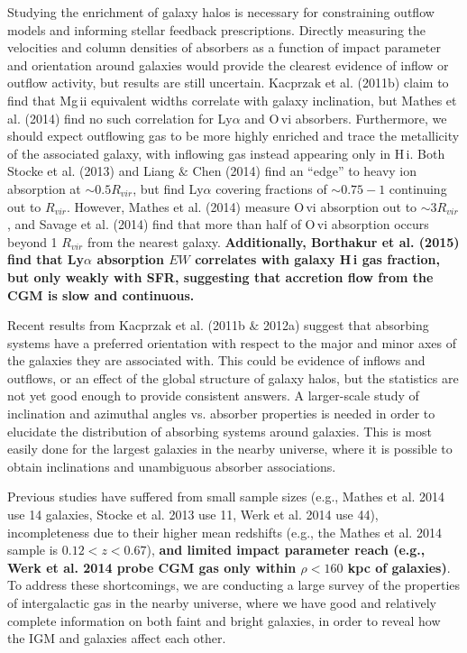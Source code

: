 \documentclass[twocolumn,tighten]{aastex6}
\begin{document}
Studying the enrichment of galaxy halos is necessary for constraining outflow models and informing stellar feedback prescriptions. Directly measuring the velocities and column densities of absorbers as a function of impact parameter and orientation around galaxies would provide the clearest evidence of inflow or outflow activity, but results are still uncertain. Kacprzak et al. (2011b) claim to find that Mg\,{\sc ii} equivalent widths correlate with galaxy inclination, but Mathes et al. (2014) find no such correlation for Ly$\alpha$ and O\,{\sc vi} absorbers. Furthermore, we should expect outflowing gas to be more highly enriched and trace the metallicity of the associated galaxy, with inflowing gas instead appearing only in H\,{\sc i}. Both Stocke et al. (2013) and Liang $\&$ Chen (2014) find an ``edge'' to heavy ion absorption at $\sim0.5R_{vir}$, but find Ly$\alpha$ covering fractions of $\sim0.75-1$ continuing out to $R_{vir}$. However, Mathes et al. (2014) measure O\,{\sc vi} absorption out to $\sim3 R_{vir}$, and Savage et al. (2014) find that more than half of O\,{\sc vi} absorption occurs beyond 1 $R_{vir}$ from the nearest galaxy. \textbf{Additionally, Borthakur et al. (2015) find that Ly$\alpha$ absorption $EW$ correlates with galaxy H\,{\sc i} gas fraction, but only weakly with SFR, suggesting that accretion flow from the CGM is slow and continuous.}

Recent results from Kacprzak et al. (2011b $\&$ 2012a) suggest that absorbing systems have a preferred orientation with respect to the major and minor axes of the galaxies they are associated with. This could be evidence of inflows and outflows, or an effect of the global structure of galaxy halos, but the statistics are not yet good enough to provide consistent answers. A larger-scale study of inclination and azimuthal angles vs. absorber properties is needed in order to elucidate the distribution of absorbing systems around galaxies. This is most easily done for the largest galaxies in the nearby universe, where it is possible to obtain inclinations and unambiguous absorber associations. 

Previous studies have suffered from small sample sizes (e.g., Mathes et al. 2014 use 14 galaxies, Stocke et al. 2013 use 11, Werk et al. 2014 use 44), incompleteness due to their higher mean redshifts (e.g., the Mathes et al. 2014 sample is $0.12 <z<0.67$), \textbf{and limited impact parameter reach (e.g., Werk et al. 2014 probe CGM gas only within $\rho < 160$ kpc of galaxies)}. To address these shortcomings, we are conducting a large survey of the properties of intergalactic gas in the nearby universe, where we have good and relatively complete information on both faint and bright galaxies, in order to reveal how the IGM and galaxies affect each other. 
\end{document}
